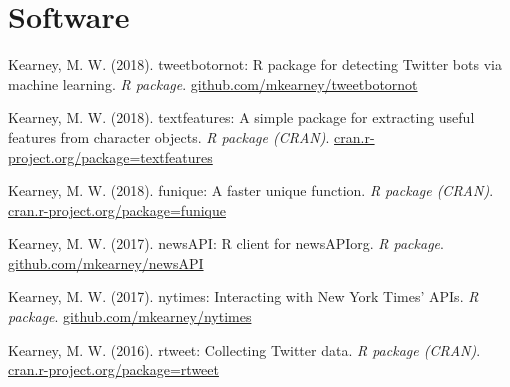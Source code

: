 \section{Software}
\begin{bibenum}

\item Kearney, M. W. (2018). tweetbotornot: R package for detecting Twitter bots via machine learning.
\textit{R package}.
\href{https://github.com/mkearney/tweetbotornot}{github.com/mkearney/tweetbotornot}

\item Kearney, M. W. (2018). textfeatures: A simple package for extracting useful features from character objects.
\textit{R package (CRAN)}.
\href{http://cran.r-project.org/package=textfeatures}{cran.r-project.org/package=textfeatures}

\item Kearney, M. W. (2018). funique: A faster unique function.
\textit{R package (CRAN)}.
\href{http://cran.r-project.org/package=funique}{cran.r-project.org/package=funique}

\item Kearney, M. W. (2017). newsAPI: R client for newsAPIorg.
\textit{R package}.
\href{https://github.com/mkearney/newsAPI}{github.com/mkearney/newsAPI}

\item Kearney, M. W. (2017). nytimes: Interacting with New York Times' APIs.
\textit{R package}.
\href{https://github.com/mkearney/nytimes}{github.com/mkearney/nytimes}

\item Kearney, M. W. (2016). rtweet: Collecting Twitter data.
\textit{R package (CRAN)}.
\href{http://cran.r-project.org/package=rtweet}{cran.r-project.org/package=rtweet}
\end{bibenum}
